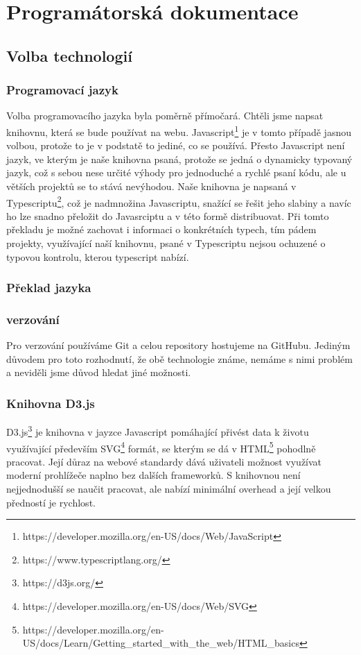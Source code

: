 
\chapter{Programátorská dokumentace}

\section{Volba technologií}

\subsection{Programovací jazyk}

Volba programovacího jazyka byla poměrně přímočará. Chtěli jsme napsat
knihovnu, která se bude používat na webu.
Javascript\footnote{https://developer.mozilla.org/en-US/docs/Web/JavaScript} je
v tomto případě jasnou volbou, protože to je v podstatě to jediné, co se
používá. Přesto Javascript není jazyk, ve kterým je naše knihovna psaná,
protože se jedná o dynamicky typovaný jazyk, což s sebou nese určité výhody pro
jednoduché a rychlé psaní kódu, ale u větších projektů se to stává nevýhodou.
Naše knihovna je napsaná v
Typescriptu\footnote{https://www.typescriptlang.org/}, což je nadmnožina
Javascriptu, snažící se řešit jeho slabiny a navíc ho lze snadno přeložit do
Javasrciptu a v této formě distribuovat. Při tomto překladu je možné zachovat i
informaci o konkrétních typech, tím pádem projekty, využívající naší knihovnu,
psané v Typescriptu nejsou ochuzené o typovou kontrolu, kterou typescript
nabízí.

\subsection{Překlad jazyka}

\subsection{verzování}

Pro verzování používáme Git a celou repository hostujeme na GitHubu. Jediným
důvodem pro toto rozhodnutí, že obě technologie známe, nemáme s nimi problém a
neviděli jsme důvod hledat jiné možnosti.

\subsection{Knihovna D3.js}

D3.js\footnote{https://d3js.org/} je knihovna v jayzce Javascript pomáhající
přivést data k životu využívající především
SVG\footnote{https://developer.mozilla.org/en-US/docs/Web/SVG} formát, se
kterým se dá v
HTML\footnote{https://developer.mozilla.org/en-US/docs/Learn/Getting_started_with_the_web/HTML_basics}
pohodlně pracovat. Její důraz na webové standardy dává uživateli možnost
využívat moderní prohlížeče naplno bez dalších frameworků. S knihovnou není
nejjednodušší se naučit pracovat, ale nabízí minimální overhead a její velkou
předností je rychlost.

